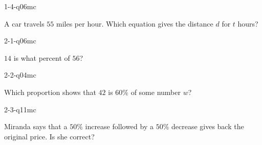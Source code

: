 
\begin{practiceQuestion}{1-4-q06}{mc}
\begin{questionText}
A car travels $55$ miles per hour. Which equation gives the distance $d$ for $t$ hours?
\end{questionText}
\end{practiceQuestion}

\begin{practiceQuestion}{2-1-q06}{mc}
\begin{questionText}
$14$ is what percent of $56$?
\end{questionText}
\end{practiceQuestion}

\begin{practiceQuestion}{2-2-q04}{mc}
\begin{questionText}
Which proportion shows that $42$ is $60\%$ of some number $w$?
\end{questionText}
\end{practiceQuestion}

\begin{practiceQuestion}{2-3-q11}{mc}
\begin{questionText}
Miranda says that a $50\%$ increase followed by a $50\%$ decrease gives back the original price. Is she correct?
\end{questionText}
\end{practiceQuestion}

